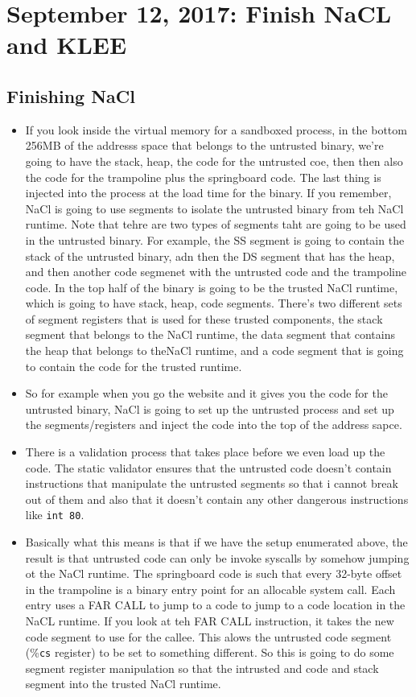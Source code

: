 \documentclass[12pt]{article}
\theoremstyle{definition}
\begin{document}
\section{September 12, 2017: Finish NaCL and KLEE}

\subsection{Finishing NaCl}
\begin{itemize}
    \itemsep0em 
	\item If you look inside the virtual memory for a sandboxed process, in the bottom 256MB of the addresss space that belongs to the untrusted binary, we're going to have the stack, heap, the code for the untrusted coe, then then also the code for the trampoline plus the springboard code. The last thing is injected into the process at the load time for the binary. If you remember, NaCl is going to use segments to isolate the untrusted binary from teh NaCl runtime. Note that tehre are two types of segments taht are going to be used in the untrusted binary. For example, the SS segment is going to contain the stack of the untrusted binary, adn then the DS segment that has the heap, and then another code segmenet with the untrusted code and the trampoline code. In the top half of the binary is going to be the trusted NaCl runtime, which is going to have stack, heap, code segments. There's two different sets of segment registers that is used for these trusted components, the stack segment that belongs to the NaCl runtime, the data segment that contains the heap that belongs to theNaCl runtime, and a code segment that is going to contain the code for the trusted runtime.
    \item So for example when you go the website and it gives you the code for the untrusted binary, NaCl is going to set up the untrusted process and set up the segments/registers and inject the code into the top of the address sapce.
    \item There is a validation process that takes place before we even load up the code. The static validator ensures that the untrusted code doesn't contain instructions that manipulate the untrusted segments so that i cannot break out of them and also that it doesn't contain any other dangerous instructions like \texttt{int 80}.
    \item  Basically what this means is that if we have the setup enumerated above, the result is that untrusted code can only be invoke syscalls by somehow jumping ot the NaCl runtime. The springboard code is such that every 32-byte offset in the trampoline is a binary entry point for an allocable system call. Each entry uses a FAR CALL to jump to a code to jump to a code location in the NaCL runtime. If you look at teh FAR CALL instruction, it takes the new code segment to use for the callee. This alows the untrusted code segment (\%\texttt{cs} register) to be set to something different. So this is going to do some segment register manipulation so that the intrusted and code and stack segment into the trusted NaCl runtime.

\end{itemize}
\end{document}

